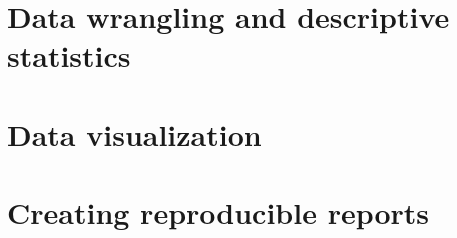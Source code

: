 \documentclass[
]{book}
\begin{document}
\hypertarget{wrangling}{%
\chapter{Data wrangling and descriptive statistics}\label{wrangling}}

\hypertarget{visualization}{%
\chapter{Data visualization}\label{visualization}}

\hypertarget{reproducible}{%
\chapter{Creating reproducible reports}\label{reproducible}}

  
\end{document}
